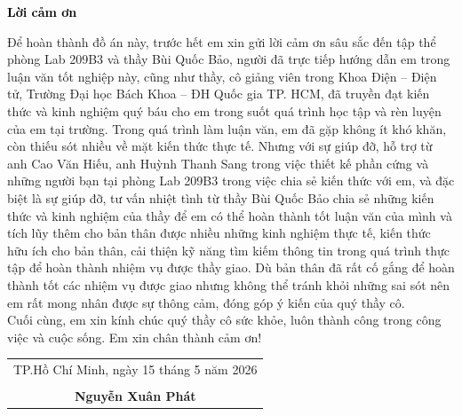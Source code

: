 \begin{center}
	{\fontsize{24pt}{24pt}\selectfont\textbf{\textcolor{black}{Lời cảm ơn}}}
\end{center}

Để hoàn thành đồ án này, trước hết em xin gửi lời cảm ơn sâu sắc đến tập thể phòng Lab 209B3 và thầy Bùi Quốc Bảo, người đã trực tiếp hướng dẫn em trong luận văn tốt nghiệp này, cũng như thầy, cô giảng viên trong Khoa Điện – Điện tử, Trường Đại học Bách Khoa – ĐH Quốc gia TP. HCM, 
đã truyền đạt kiến thức và kinh nghiệm quý báu cho em trong suốt quá trình học tập và rèn luyện của em tại trường. 
Trong quá trình làm luận văn, em đã gặp không ít khó khăn, còn thiếu sót nhiều về mặt kiến thức thực tế. Nhưng với sự giúp đỡ, hỗ trợ từ anh Cao Văn Hiếu, anh Huỳnh Thanh Sang trong việc thiết kế phần cứng và những người bạn tại phòng Lab 209B3 trong việc chia sẻ kiến thức với em, và đặc biệt là sự giúp đỡ,
tư vấn nhiệt tình từ thầy Bùi Quốc Bảo chia sẻ những kiến thức và kinh nghiệm của thầy để em có thể hoàn thành tốt luận văn của mình và tích lũy thêm cho bản thân được nhiều những kinh nghiệm thực tế, kiến thức hữu ích cho bản thân, 
cải thiện kỹ năng tìm kiếm thông tin trong quá trình thực tập để hoàn thành nhiệm vụ được thầy giao. Dù bản thân đã rất cố gắng để hoàn thành tốt các nhiệm vụ được giao nhưng không thể tránh khỏi những sai sót nên em rất mong nhân được sự thông cảm, đóng góp ý kiến của quý thầy cô.\\

Cuối cùng, em xin kính chúc quý thầy cô sức khỏe, luôn thành công trong công việc và cuộc sống. Em xin chân thành cảm ơn!\\
\begin{flushright}
    \begin{tabular}{@{}c@{}}
        TP.Hồ Chí Minh, ngày 15 tháng 5 năm 2026 \\
        \\[1.5cm] %
        \textbf{Nguyễn Xuân Phát} %
    \end{tabular}
\end{flushright}